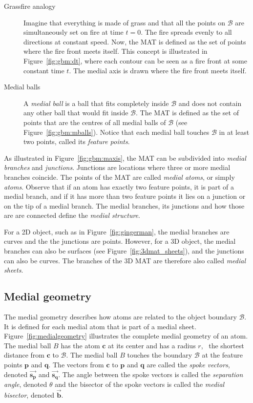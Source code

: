 \begin{description}
	\item[Grassfire analogy]
	Imagine that everything is made of grass and that all the points on $\mathcal{B}$ are simultaneously set on fire at time $t=0$. 
	The fire spreads evenly to all directions at constant speed. 
	Now, the MAT is defined as the set of points where the fire front meets itself. 
	This concept is illustrated in Figure~\ref{fig:gbm:dt}, where each contour can be seen as a fire front at some constant time $t$. The medial axis is drawn where the fire front meets itself.
	\item[Medial balls]
	A \emph{medial ball} is a ball that fits completely inside $\mathcal{B}$ and does not contain any other ball that would fit inside $\mathcal{B}$. 
	The MAT is defined as the set of points that are the centres of all medial balls of $\mathcal{B}$ (see Figure~\ref{fig:gbm:mballs}). 
	Notice that each medial ball touches $\mathcal{B}$ in at least two points, called its \emph{feature points}. 
\end{description}

As illustrated in Figure~\ref{fig:gbm:maxis}, the MAT can be subdivided into \emph{medial branches} and \emph{junctions}. 
Junctions are locations where three or more medial branches coincide. 
The points of the MAT are called \emph{medial atoms}, or simply \emph{atoms}. 
Observe that if an atom has exactly two feature points, it is part of a medial branch, and if it has more than two feature points it lies on a junction or on the tip of a medial branch. 
The medial branches, its junctions and how those are are connected define the \emph{medial structure}.

For a 2D object, such as in Figure~\ref{fig:gingerman}, the medial branches are curves and the the junctions are points. 
However, for a 3D object, the medial branches can also be surfaces (see Figure~\ref{fig:3dmat_sheets}), and the junctions can also be curves.
The branches of the 3D MAT are therefore also called \emph{medial sheets}.

\subsection{Medial geometry}
The medial geometry describes how atoms are related to the object boundary $\mathcal{B}$. 
It is defined for each medial atom that is part of a medial sheet. 
Figure~\ref{fig:medialgeometry} illustrates the complete medial geometry of an atom.
The medial ball $B$ has the atom $\mathbf{c}$ at its center and has a radius $r$, \ie\ the shortest distance from $\mathbf{c}$ to $\mathcal{B}$.
The medial ball $B$ touches the boundary $\mathcal{B}$ at the feature points $\mathbf{p}$ and $\mathbf{q}$.
The vectors from $\mathbf{c}$ to $\mathbf{p}$ and $\mathbf{q}$ are called the \emph{spoke vectors}, denoted $\vec{\mathbf{s_{p}}}$ and $\vec{\mathbf{s_{q}}}$. 
The angle between the spoke vectors is called the \emph{separation angle}, denoted $\theta$ and the bisector of the spoke vectors is called the \emph{medial bisector}, denoted $\vec{\mathbf{b}}$.


